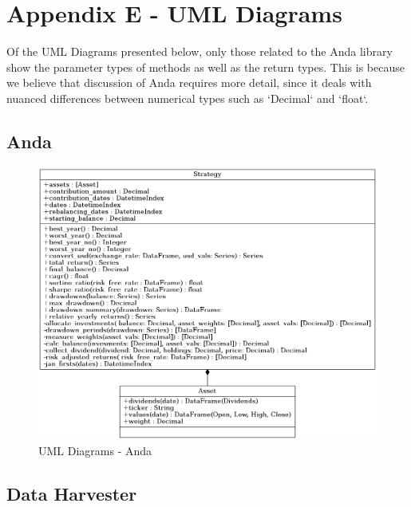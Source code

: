 \documentclass[main.tex]{subfiles}
\begin{document}
\section{Appendix E - UML Diagrams}
\label{umls}

Of the UML Diagrams presented below, only those related to the Anda library show the parameter types of methods as well as the return types. This is because we believe that discussion of Anda requires more detail, since it deals with nuanced differences between numerical types such as `Decimal` and `float`.

\subsection{Anda}

\begin{figure}[H]
   \centering
   \includegraphics[width=\textwidth,keepaspectratio]{Report/08Appendices/084UML/084Pictures/classes_analyse_data.png}
   \caption{UML Diagrams - Anda}
\end{figure}

\subsection{Data Harvester}
\end{document}
